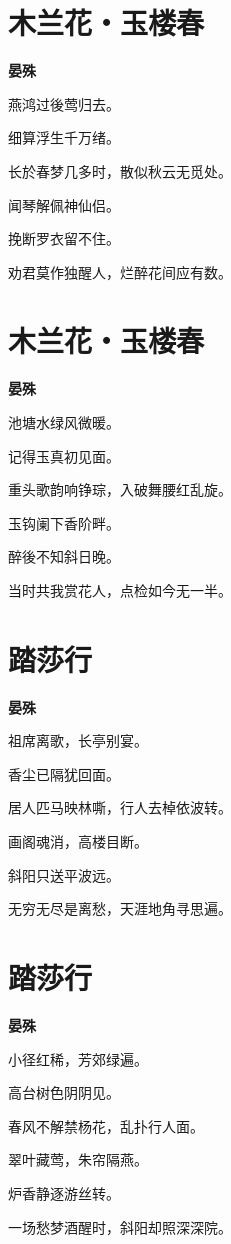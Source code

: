 \documentclass[12pt,a4paper]{ctexbook}
\begin{document}
\section{木兰花・玉楼春}
\textbf{晏殊}\par\vspace{0.5em}
燕鸿过後莺归去。\par
细算浮生千万绪。\par
长於春梦几多时，散似秋云无觅处。\par
闻琴解佩神仙侣。\par
挽断罗衣留不住。\par
劝君莫作独醒人，烂醉花间应有数。\par

\section{木兰花・玉楼春}
\textbf{晏殊}\par\vspace{0.5em}
池塘水绿风微暖。\par
记得玉真初见面。\par
重头歌韵响铮琮，入破舞腰红乱旋。\par
玉钩阑下香阶畔。\par
醉後不知斜日晚。\par
当时共我赏花人，点检如今无一半。\par

\section{踏莎行}
\textbf{晏殊}\par\vspace{0.5em}
祖席离歌，长亭别宴。\par
香尘已隔犹回面。\par
居人匹马映林嘶，行人去棹依波转。\par
画阁魂消，高楼目断。\par
斜阳只送平波远。\par
无穷无尽是离愁，天涯地角寻思遍。\par

\section{踏莎行}
\textbf{晏殊}\par\vspace{0.5em}
小径红稀，芳郊绿遍。\par
高台树色阴阴见。\par
春风不解禁杨花，乱扑行人面。\par
翠叶藏莺，朱帘隔燕。\par
炉香静逐游丝转。\par
一场愁梦酒醒时，斜阳却照深深院。\par
\end{document}

